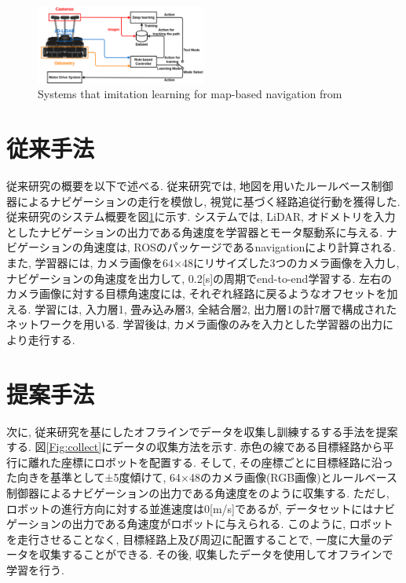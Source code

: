 \documentclass[10pt]{ujarticle}
\begin{document}
    \begin{figure}[!b]
        \centering
        \includegraphics[width=0.5\textwidth]{fig/okada.pdf}
        \caption{Systems that imitation learning for map-based navigation from\cite{si2020-okada}}
        \label{Fig:si2020-okada}
    \end{figure}
    
    \section{従来手法}%
    従来研究の概要を以下で述べる. 従来研究では, 地図を用いたルールベース制御器によるナビゲーションの走行を模倣し, 視覚に基づく経路追従行動を獲得した. 従来研究のシステム概要を図\ref{Fig:si2020-okada}に示す. システムでは, LiDAR, オドメトリを入力としたナビゲーションの出力である角速度を学習器とモータ駆動系に与える. ナビゲーションの角速度は, ROSのパッケージであるnavigation\cite{navigation}により計算される. また, 学習器には, カメラ画像を64×48にリサイズした3つのカメラ画像を入力し, ナビゲーションの角速度を出力して, 0.2[s]の周期でend-to-end学習する. 左右のカメラ画像に対する目標角速度には, それぞれ経路に戻るようなオフセットを加える. 学習には, 入力層1, 畳み込み層3, 全結合層2, 出力層1の計7層で構成されたネットワークを用いる. 学習後は, カメラ画像のみを入力とした学習器の出力により走行する. 

    \section{提案手法}%
    次に, 従来研究を基にしたオフラインでデータを収集し訓練するする手法を提案する. 図\ref{Fig:collect}にデータの収集方法を示す. 赤色の線である目標経路から平行に離れた座標にロボットを配置する. そして, その座標ごとに目標経路に沿った向きを基準として±5度傾けて, 64×48のカメラ画像(RGB画像)とルールベース制御器によるナビゲーションの出力である角速度をのように収集する. ただし, ロボットの進行方向に対する並進速度は0[m/s]であるが, データセットにはナビゲーションの出力である角速度がロボットに与えられる. このように, ロボットを走行させることなく, 目標経路上及び周辺に配置することで, 一度に大量のデータを収集することができる. その後, 収集したデータを使用してオフラインで学習を行う. 
\end{document}
